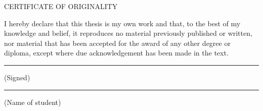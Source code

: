 \thispagestyle{empty}
CERTIFICATE OF ORIGINALITY

I hereby declare that this thesis is my own work and that, to the best of my knowledge and belief, it reproduces no material previously published or written, nor material that has been accepted for the award of any other degree or diploma, except where due acknowledgement has been made in the text.

\bigskip
\rule{5cm}{0.15mm} (Signed)

\bigskip
\rule{5cm}{0.15mm} (Name of student)